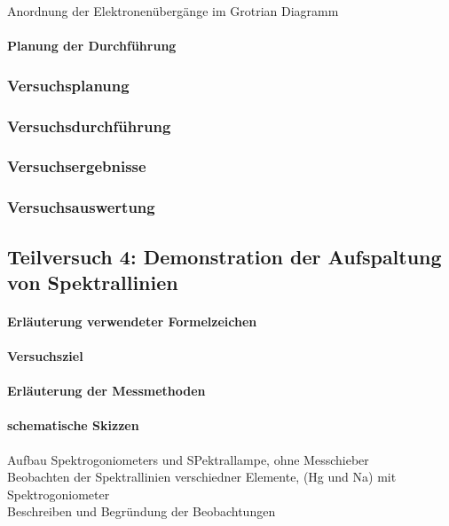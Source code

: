 \documentclass[12pt,oneside,oldfontcommands]{memoir}
\begin{document}
Anordnung der Elektronenübergänge im Grotrian Diagramm\\

\paragraph{Planung der Durchführung}
\subsubsection{Versuchsplanung}
\subsubsection{Versuchsdurchführung}
\subsubsection{Versuchsergebnisse}
\subsubsection{Versuchsauswertung}

\subsection{Teilversuch 4: Demonstration der Aufspaltung von Spektrallinien}
\paragraph{Erläuterung verwendeter Formelzeichen}
\paragraph{Versuchsziel}
\paragraph{Erläuterung der Messmethoden}
\paragraph{schematische Skizzen}

Aufbau Spektrogoniometers und SPektrallampe, ohne Messchieber\\

Beobachten der Spektrallinien verschiedner Elemente, (Hg und Na) mit Spektrogoniometer\\

Beschreiben und Begründung der Beobachtungen\\
\end{document}
